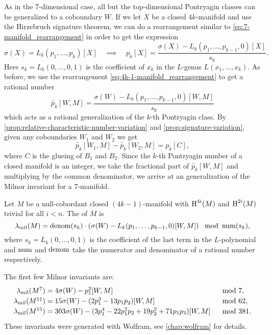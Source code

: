 As in the $7$-dimensional case, all but the top-dimensional Pontryagin classes can be generalized to a coboundary $W$.
If we let $X$ be a closed $4k$-manifold and use the Hirzebruch signature theorem, we can do a rearrangement similar to \cref{eq:7-manifold_rearrangement} in order to get the expression
\begin{equation}\label{eq:4k-1-manifold_rearrangement}
	\sigma(X) = L_k(p_1, \ldots, p_k)[X]\quad\implies\quad
	p_k[X] = \frac{\sigma(X) - L_k(p_1,\ldots, p_{k-1}, 0)[X]}{s_k}.
\end{equation}
Here $s_k=L_k(0,\ldots, 0, 1)$ is the coefficient of $x_k$ in the $L$-genus $L(x_1,\ldots, x_k)$.
As before, we use the rearrangement \cref{eq:4k-1-manifold_rearrangement} to get a rational number
\[
	\widetilde{p_k}[W, M] = \frac{\sigma(W) - L_k(p_1,\ldots, p_{k-1}, 0)[W,M]}{s_k}
\]
which acts as a rational generalization of the $k$-th Pontryagin class. By \cref{prop:relative-characteristic-number-variation} and \cref{prop:signature-variation}, given any coboundaries $W_1$ and $W_2$ we get
\[
	\widetilde{p_k}[W_1, M] - \widetilde{p_k}[W_2, M] = p_k[C],
\]
where $C$ is the glueing of $B_1$ and $B_2$. Since the $k$-th Pontryagin number of a closed manifold is an integer, we take the fractional part of $\widetilde{p_k}[W,M]$ and multiplying by the common denominator, we arrive at an generalization of the Milnor invariant for a $7$-manifold.

\begin{definition}
	Let $M$ be a null-cobordant closed $(4k-1)$-manifold with $\operatorname{H}^{4i}(M)$ and $\operatorname{H}^{2i}(M)$ trivial for all $i<n$. The  of $M$ is
	\[
		\lambda_{\mathrm{mil}}(M) = \operatorname{denom}(s_k)\cdot \left(\sigma(W) - L_k(p_1, \ldots, p_{k-1},0)[W,M]\right)\mod {\operatorname{num}}(s_k),
	\]
	where $s_k = L_k(0,\ldots,0,1)$ is the coefficient of the last term in the $L$-polynomial and $\operatorname{num}$ and $\operatorname{denom}$ take the numerator and denominator of a rational number respectively.
\end{definition}

\begin{example}
	The first few Milnor invariants are:
	\[
		\renewcommand{\arraystretch}{1.2}
		\begin{array}{r@{\;}ll}
			\milinv(M^7)
			 &= 4\sigma(W) - p_1^2[W, M]
			 & \mod 7,                                                            \\
			\milinv(M^{11})
			 &= 15\sigma(W) - (2p_1^3-13p_1p_2)[W,M]
			 & \mod 62,                                                          \\
			\milinv(M^{15})
			 &= 303\sigma(W) - (3p_1^4-22p_1^2p_2 + 19p_2^2 + 71p_1p_3)[W,M]
			 & \mod 381.
		\end{array}
	\]
	These invariants were generated with Wolfram, see \cref{chap:wolfram} for details.
\end{example}

